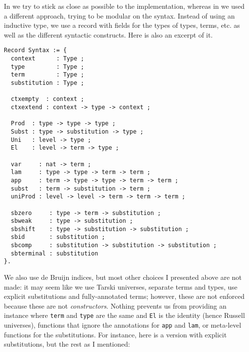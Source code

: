 In \MetaCoq we try to stick as close as possible to the \Coq implementation,
whereas in \ftt we used a different approach, trying to be modular on the
syntax. Instead of using an inductive type, we use a record with fields for the
types of types, terms, etc. as well as the different syntactic constructs.
Here is also an excerpt of it.
\begin{verbatim}
Record Syntax := {
  context      : Type ;
  type         : Type ;
  term         : Type ;
  substitution : Type ;

  ctxempty  : context ;
  ctxextend : context -> type -> context ;

  Prod  : type -> type -> type ;
  Subst : type -> substitution -> type ;
  Uni   : level -> type ;
  El    : level -> term -> type ;

  var     : nat -> term ;
  lam     : type -> type -> term -> term ;
  app     : term -> type -> type -> term -> term ;
  subst   : term -> substitution -> term ;
  uniProd : level -> level -> term -> term -> term ;

  sbzero     : type -> term -> substitution ;
  sbweak     : type -> substitution ;
  sbshift    : type -> substitution -> substitution ;
  sbid       : substitution ;
  sbcomp     : substitution -> substitution -> substitution ;
  sbterminal : substitution
}.
\end{verbatim}
We also use de Bruijn indices, but most other choices I presented above are not
made: it may seem like we use Tarski universes, separate terms and types, use
explicit substitutions and fully-annotated terms;
however, these are not enforced because these are not \emph{constructors}.
Nothing prevents us from providing an instance where \texttt{term}
and \texttt{type} are the same and \texttt{El} is the identity
(hence Russell universes), functions that ignore the annotations for
\texttt{app} and \texttt{lam}, or meta-level functions for
the substitutions.
For instance, here is a version with explicit substitutions, but the rest as I
mentioned:
